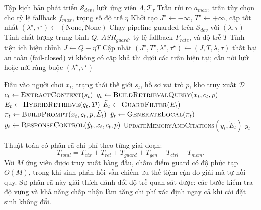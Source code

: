 ﻿\documentclass[a4paper,12pt]{article}
\begin{document}
\begin{algorithm}[H]
\caption{Hiệu chỉnh tham số guard dưới ràng buộc rủi ro}
\begin{algorithmic}[1]
\Require Tập kịch bản phát triển \(\mathcal{S}_{dev}\), lưới ứng viên \(\Lambda,\mathcal{T}_{\tau}\)
\Require Trần rủi ro \(a_{max}\), trần tùy chọn cho tỷ lệ fallback \(f_{max}\), trọng số độ trễ \(\eta\)
\State Khởi tạo \(J^\star\gets-\infty\), \(T^\star\gets+\infty\), cặp tốt nhất \((\lambda^\star,\tau^\star)\gets(\text{None},\text{None})\)
    \State Chạy pipeline guarded trên \(\mathcal{S}_{dev}\) với \((\lambda,\tau)\)
    \State Tính chất lượng trung bình \(\bar{Q}\), \(ASR_{guard}\), tỷ lệ fallback \(F_{rate}\), và độ trễ \(T\)
      \State Tính tiện ích hiệu chỉnh \(J\gets \bar{Q}-\eta T\)
        \State Cập nhật \((J^\star,T^\star,\lambda^\star,\tau^\star)\gets(J,T,\lambda,\tau)\)
      \EndIf
    \EndIf
  \EndFor
\EndFor
{}
  \State \Return thất bại an toàn (fail-closed) vì không có cặp khả thi dưới các trần hiện tại; cần nới lưới hoặc nới ràng buộc
\EndIf
\State \Return \((\lambda^\star,\tau^\star)\)
\end{algorithmic}
\end{algorithm}

\begin{algorithm}[H]
\caption{Suy luận thời gian chạy với kiểm soát phản hồi có bảo vệ}
\begin{algorithmic}[1]
\Require Đầu vào người chơi $x_t$, trạng thái thế giới $s_t$, hồ sơ vai trò $p$, kho truy xuất $\mathcal{D}$
\State $c_t \gets \textsc{ExtractContext}(s_t)$
\State $q_t \gets \textsc{BuildRetrievalQuery}(x_t,c_t,p)$
\State $E_t \gets \textsc{HybridRetrieve}(q_t,\mathcal{D})$
\State $\tilde{E}_t \gets \textsc{GuardFilter}(E_t)$
\State $\pi_t \gets \textsc{BuildPrompt}(x_t,c_t,p,\tilde{E}_t)$
\State $\hat{y}_t \gets \textsc{GenerateLocal}(\pi_t)$
\State $y_t \gets \textsc{ResponseControl}(\hat{y}_t, x_t, c_t, p)$
\State \textsc{UpdateMemoryAndCitations}$(y_t,\tilde{E}_t)$
\State \Return $y_t$
\end{algorithmic}
\end{algorithm}

Thuật toán có phân rã chi phí theo từng giai đoạn:
\begin{equation}
T_{total}=T_{ctx}+T_{ret}+T_{guard}+T_{gen}+T_{ctrl}+T_{mem}.
\end{equation}
Với \(M\) ứng viên được truy xuất hàng đầu, chấm điểm guard có độ phức tạp \(O(M)\), trong khi sinh phản hồi vẫn chiếm ưu thế tiệm cận do giải mã tự hồi quy. Sự phân rã này giải thích đánh đổi độ trễ quan sát được: các bước kiểm tra độ vững và khả năng chấp nhận làm tăng chi phí xác định ngay cả khi cài đặt sinh không đổi.
\end{document}
